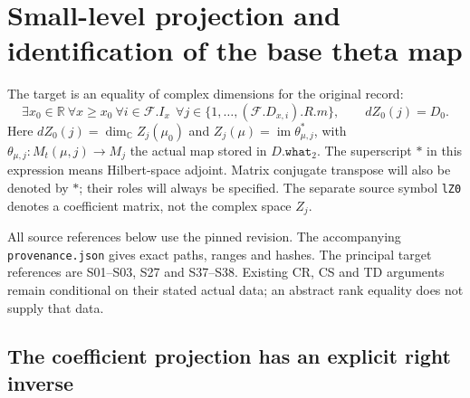 \section{Small-level projection and identification of the base theta map}
\label{sec:small-level-rank}


The target is an equality of complex dimensions for the original record:
\[
 \exists x_0\in\mathbb R\ \forall x\ge x_0\ \forall i\in\mathcal F.I_x\
 \ \forall j\in\{1,\ldots,(\mathcal F.D_{x,i}).R.m\},\qquad
       dZ_0(j)=D_0.                                      \tag{SLR.1}
\]
Here $dZ_0(j)=\dim_{\mathbb C}Z_j(\mu_0)$ and
$Z_j(\mu)=\operatorname{im}\theta_{\mu,j}^{*}$, with
$\theta_{\mu,j}:M_t(\mu,j)\to M_j$ the actual map stored in
$D.\texttt{what}_2$.  The superscript $*$ in this expression means
Hilbert-space adjoint.  Matrix conjugate transpose will also be denoted
by $*$; their roles will always be specified.  The separate source
symbol \texttt{lZ0} denotes a coefficient matrix, not the complex
space $Z_j$.

All source references below use the pinned revision.  The accompanying
\texttt{provenance.json} gives exact paths, ranges and hashes.  The principal target references are S01--S03, S27
and S37--S38.  Existing CR, CS and TD arguments remain conditional on
their stated actual data; an abstract rank equality does not supply
that data.

\subsection{The coefficient projection has an explicit right inverse}


